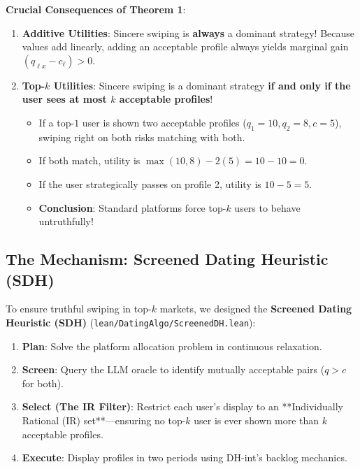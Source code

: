 \documentclass[11pt,letterpaper]{article}
\theoremstyle{definition}
\theoremstyle{plain}
\theoremstyle{remark}
\begin{document}
\noindent \textbf{Crucial Consequences of Theorem 1}:
\begin{enumerate}[leftmargin=2em]
    \item \textbf{Additive Utilities}: Sincere swiping is \textbf{always} a dominant strategy! Because values add linearly, adding an acceptable profile always yields marginal gain $(q_{\ell x} - c_\ell) > 0$.
    \item \textbf{Top-$k$ Utilities}: Sincere swiping is a dominant strategy \textbf{if and only if the user sees at most $k$ acceptable profiles}! 
    \begin{itemize}
        \item If a top-$1$ user is shown two acceptable profiles ($q_1 = 10, q_2 = 8, c = 5$), swiping right on both risks matching with both. 
        \item If both match, utility is $\max(10, 8) - 2(5) = 10 - 10 = 0$.
        \item If the user strategically passes on profile 2, utility is $10 - 5 = 5$.
        \item \textbf{Conclusion}: Standard platforms force top-$k$ users to behave untruthfully!
    \end{itemize}
\end{enumerate}

\subsection{The Mechanism: Screened Dating Heuristic (SDH)}
To ensure truthful swiping in top-$k$ markets, we designed the \textbf{Screened Dating Heuristic (SDH)} (\texttt{lean/DatingAlgo/ScreenedDH.lean}):
\begin{enumerate}[leftmargin=2em]
    \item \textbf{Plan}: Solve the platform allocation problem in continuous relaxation.
    \item \textbf{Screen}: Query the LLM oracle to identify mutually acceptable pairs ($q > c$ for both).
    \item \textbf{Select (The IR Filter)}: Restrict each user's display to an **Individually Rational (IR) set**—ensuring no top-$k$ user is ever shown more than $k$ acceptable profiles.
    \item \textbf{Execute}: Display profiles in two periods using DH-int's backlog mechanics.
\end{enumerate}
\end{document}
